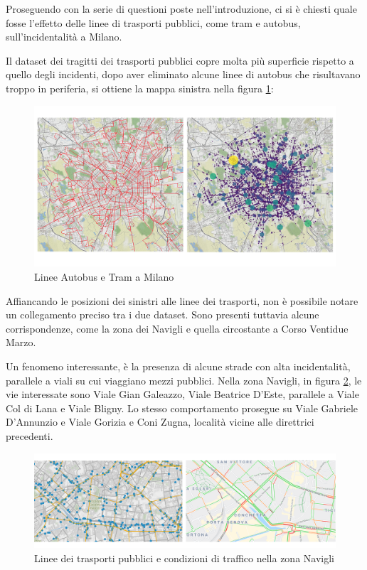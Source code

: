 \documentclass[a4paper,12pt]{report}
\begin{document}
Proseguendo con la serie di questioni poste nell'introduzione, ci si è chiesti quale 
fosse l'effetto delle linee di trasporti pubblici, come tram e autobus, 
sull'incidentalità a Milano. 

Il dataset dei tragitti dei trasporti pubblici copre molta più superficie rispetto a 
quello degli incidenti, dopo aver eliminato alcune linee di autobus che risultavano 
troppo in periferia, si ottiene la mappa sinistra nella figura \ref{fig:geo-trasporti}: 

\begin{figure}
    \includegraphics[width=\linewidth]{../src/atm/linee_atm.png}
    \caption{Linee Autobus e Tram a Milano}
    \label{fig:geo-trasporti}
\end{figure}

Affiancando le posizioni dei sinistri alle linee dei trasporti, 
non è possibile notare un collegamento preciso tra i due dataset. 
Sono presenti tuttavia alcune corrispondenze, come la zona dei Navigli 
e quella circostante a Corso Ventidue Marzo. 

Un fenomeno interessante, è la presenza di alcune strade con alta incidentalità, 
parallele a viali su cui viaggiano mezzi pubblici. 
Nella zona Navigli, in figura \ref{fig:navigli}, le vie 
interessate sono Viale Gian Galeazzo, Viale Beatrice D'Este, 
parallele a Viale Col di Lana e Viale Bligny. 
Lo stesso comportamento prosegue su Viale Gabriele D'Annunzio e Viale Gorizia e Coni Zugna, 
località vicine alle direttrici precedenti. 

\begin{figure}
    \includegraphics[width=\linewidth]{../src/atm/navigli.png}
    \caption{Linee dei trasporti pubblici e condizioni di traffico nella zona Navigli}
    \label{fig:navigli}
\end{figure}
\end{document}
